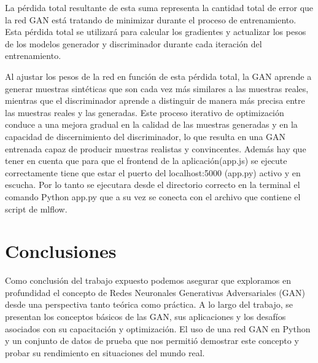 La pérdida total resultante de esta suma representa la cantidad total de error que la red GAN está tratando de minimizar durante el proceso de entrenamiento. Esta pérdida total se utilizará para calcular los gradientes y actualizar los pesos de los modelos generador y discriminador durante cada iteración del entrenamiento.

Al ajustar los pesos de la red en función de esta pérdida total, la GAN aprende a generar muestras sintéticas que son cada vez más similares a las muestras reales, mientras que el discriminador aprende a distinguir de manera más precisa entre las muestras reales y las generadas. Este proceso iterativo de optimización conduce a una mejora gradual en la calidad de las muestras generadas y en la capacidad de discernimiento del discriminador, lo que resulta en una GAN entrenada capaz de producir muestras realistas y convincentes.
Además hay que tener en cuenta que para que el frontend de la aplicación(app.js) se ejecute correctamente tiene que estar el puerto del localhost:5000 (app.py) activo y en escucha. Por lo tanto se ejecutara desde el directorio correcto en la terminal el comando Python app.py que a su vez se conecta con el archivo que contiene el script de mlflow.


\newpage
\thispagestyle{empty} %
\mbox{} %
\section{Conclusiones}\label{sec:conclusiones}

Como conclusión del trabajo expuesto podemos asegurar que exploramos en profundidad el concepto de Redes Neuronales Generativas Adversariales (GAN) desde una perspectiva tanto teórica como práctica. A lo largo del trabajo, se presentan los conceptos básicos de las GAN, sus aplicaciones y los desafíos asociados con su capacitación y optimización. El uso de una red GAN en Python y un conjunto de datos de prueba que nos permitió demostrar este concepto y probar su rendimiento en situaciones del mundo real.
